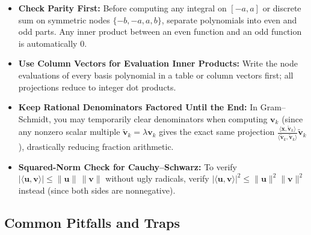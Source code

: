 \documentclass[11pt, letterpaper]{article}
\theoremstyle{definition}
\theoremstyle{remark}
\begin{document}
\begin{itemize}
    \item \textbf{Check Parity First:} Before computing any integral on $[-a, a]$ or discrete sum on symmetric nodes $\{-b, -a, a, b\}$, separate polynomials into even and odd parts. Any inner product between an even function and an odd function is automatically $0$.
    \item \textbf{Use Column Vectors for Evaluation Inner Products:} Write the node evaluations of every basis polynomial in a table or column vectors first; all projections reduce to integer dot products.
    \item \textbf{Keep Rational Denominators Factored Until the End:} In Gram--Schmidt, you may temporarily clear denominators when computing $\mathbf{v}_k$ (since any nonzero scalar multiple $\tilde{\mathbf{v}}_k = \lambda \mathbf{v}_k$ gives the exact same projection $\frac{\langle \mathbf{x}, \tilde{\mathbf{v}}_k \rangle}{\langle \tilde{\mathbf{v}}_k, \tilde{\mathbf{v}}_k \rangle}\tilde{\mathbf{v}}_k$), drastically reducing fraction arithmetic.
    \item \textbf{Squared-Norm Check for Cauchy--Schwarz:} To verify $|\langle \mathbf{u}, \mathbf{v} \rangle| \le \|\mathbf{u}\|\,\|\mathbf{v}\|$ without ugly radicals, verify $|\langle \mathbf{u}, \mathbf{v} \rangle|^2 \le \|\mathbf{u}\|^2 \|\mathbf{v}\|^2$ instead (since both sides are nonnegative).
\end{itemize}

\subsection{Common Pitfalls and Traps}
\end{document}
